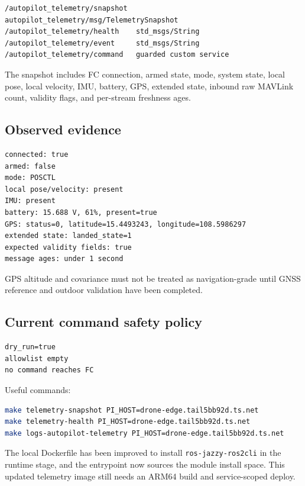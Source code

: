 \documentclass[11pt,a4paper]{article}
\newcommand{\pathtext}[1]{\texttt{#1}}
\begin{document}
\begin{lstlisting}
/autopilot_telemetry/snapshot  autopilot_telemetry/msg/TelemetrySnapshot
/autopilot_telemetry/health    std_msgs/String
/autopilot_telemetry/event     std_msgs/String
/autopilot_telemetry/command   guarded custom service
\end{lstlisting}

The snapshot includes FC connection, armed state, mode, system state, local
pose, local velocity, IMU, battery, GPS, extended state, inbound raw MAVLink
count, validity flags, and per-stream freshness ages.

\subsection{Observed evidence}

\begin{lstlisting}
connected: true
armed: false
mode: POSCTL
local pose/velocity: present
IMU: present
battery: 15.688 V, 61%, present=true
GPS: status=0, latitude=15.4493243, longitude=108.5986297
extended state: landed_state=1
expected validity fields: true
message ages: under 1 second
\end{lstlisting}

GPS altitude and covariance must not be treated as navigation-grade until GNSS
reference and outdoor validation have been completed.

\subsection{Current command safety policy}

\begin{lstlisting}
dry_run=true
allowlist empty
no command reaches FC
\end{lstlisting}

Useful commands:

\begin{lstlisting}[language=bash]
make telemetry-snapshot PI_HOST=drone-edge.tail5bb92d.ts.net
make telemetry-health PI_HOST=drone-edge.tail5bb92d.ts.net
make logs-autopilot-telemetry PI_HOST=drone-edge.tail5bb92d.ts.net
\end{lstlisting}

The local Dockerfile has been improved to install \pathtext{ros-jazzy-ros2cli}
in the runtime stage, and the entrypoint now sources the module install space.
This updated telemetry image still needs an ARM64 build and service-scoped deploy.
\end{document}
